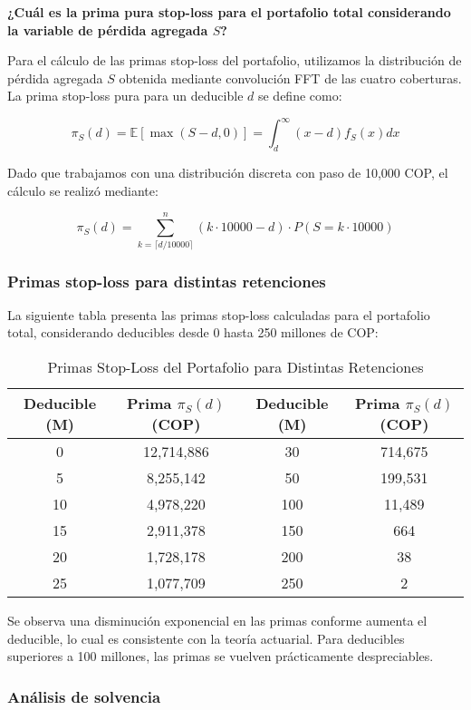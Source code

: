 \textbf{¿Cuál es la prima pura stop-loss para el portafolio total considerando la variable de pérdida agregada $S$?}

Para el cálculo de las primas stop-loss del portafolio, utilizamos la distribución de pérdida agregada $S$ obtenida mediante convolución FFT de las cuatro coberturas. La prima stop-loss pura para un deducible $d$ se define como:

$$\pi_S(d) = \mathbb{E}[\max(S - d, 0)] = \int_d^{\infty} (x - d) f_S(x) dx$$

Dado que trabajamos con una distribución discreta con paso de 10,000 COP, el cálculo se realizó mediante:

$$\pi_S(d) = \sum_{k=\lceil d/10000 \rceil}^{n} (k \cdot 10000 - d) \cdot P(S = k \cdot 10000)$$

\subsubsection{Primas stop-loss para distintas retenciones}

La siguiente tabla presenta las primas stop-loss calculadas para el portafolio total, considerando deducibles desde 0 hasta 250 millones de COP:

\begin{table}[H]
\centering
\caption{Primas Stop-Loss del Portafolio para Distintas Retenciones}
\begin{tabular}{|c|c|c|c|}
\hline
\textbf{Deducible (M)} & \textbf{Prima $\pi_S(d)$ (COP)} & \textbf{Deducible (M)} & \textbf{Prima $\pi_S(d)$ (COP)} \\
\hline
0 & 12,714,886 & 30 & 714,675 \\
5 & 8,255,142 & 50 & 199,531 \\
10 & 4,978,220 & 100 & 11,489 \\
15 & 2,911,378 & 150 & 664 \\

20 & 1,728,178 & 200 & 38 \\
25 & 1,077,709 & 250 & 2 \\
\hline
\end{tabular}
\end{table}

Se observa una disminución exponencial en las primas conforme aumenta el deducible, lo cual es consistente con la teoría actuarial. Para deducibles superiores a 100 millones, las primas se vuelven prácticamente despreciables.

\subsubsection{Análisis de solvencia}

